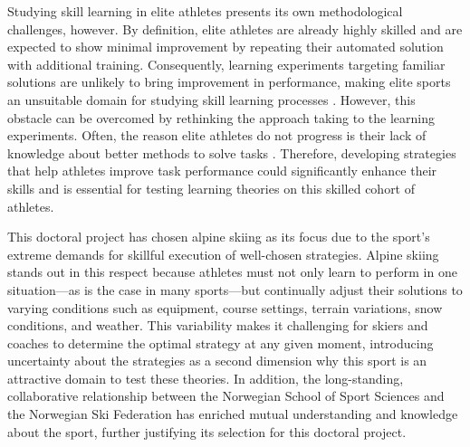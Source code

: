 Studying skill learning in elite athletes presents its own methodological challenges, however. By definition, elite athletes are already highly skilled and are expected to show minimal improvement by repeating their automated solution with additional training\cite{ericsson_development_2003, ericsson_expert_1994, ericsson_scientific_1998}. Consequently, learning experiments targeting familiar solutions are unlikely to bring improvement in performance, making elite sports an unsuitable domain for studying skill learning processes  \cite{thorndike_educational_1913, ericsson_development_2003, grayloooooong, grayshort, ericsson_scientific_1998}. However, this obstacle can be overcomed by rethinking the approach taking to the learning experiments. Often, the reason elite athletes do not progress is their lack of knowledge about better methods to solve tasks \cite{grayloooooong, grayshort, thorndike_educational_1913}. Therefore, developing strategies that help athletes improve task performance could significantly enhance their skills and is essential for testing learning theories on this skilled cohort of athletes. 

This doctoral project has chosen alpine skiing as its focus due to the sport's extreme demands for skillful execution of well-chosen strategies. Alpine skiing stands out in this respect because athletes must not only learn to perform in one situation—as is the case in many sports—but continually adjust their solutions to varying conditions such as equipment, course settings, terrain variations, snow conditions, and weather. This variability makes it challenging for skiers and coaches to determine the optimal strategy at any given moment, introducing uncertainty about the strategies as a second dimension why this sport is an attractive domain to test these theories. In addition, the long-standing, collaborative relationship between the Norwegian School of Sport Sciences and the Norwegian Ski Federation has enriched mutual understanding and knowledge about the sport, further justifying its selection for this doctoral project. 

